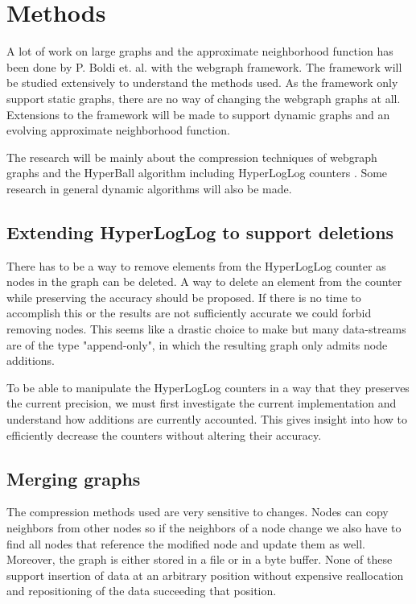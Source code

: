 \chapter{Methods}


A lot of work on large graphs and the approximate neighborhood function has been done by P. Boldi et. al. with the webgraph framework\cite{webgraph}. The framework will be studied extensively to understand the methods used. As the framework only support static graphs, there are no way of changing the webgraph graphs at all. Extensions to the framework will be made to support dynamic graphs and an evolving approximate neighborhood function. 

The research will be mainly about the compression techniques of webgraph graphs \cite{webgraph-compression} and the HyperBall algorithm \cite{hyperball} including HyperLogLog counters \cite{hyperloglog}. Some research in general dynamic algorithms will also be made.

\section{Extending HyperLogLog to support deletions}
There has to be a way to remove elements from the HyperLogLog counter as nodes in the graph can be deleted. A way to delete an element from the counter while preserving the accuracy should be proposed. If there is no time to accomplish this or the results are not sufficiently accurate we could forbid removing nodes. This seems like a drastic choice to make but many data-streams are of the type "append-only", in which the resulting graph only admits node additions.

To be able to manipulate the HyperLogLog counters in a way that they preserves the current precision, we must first investigate the current implementation and understand how additions are currently accounted. This gives insight into how to efficiently decrease the counters without altering their accuracy.

\section{Merging graphs}

The compression methods used are very sensitive to changes. Nodes can copy neighbors from other nodes so if the neighbors of a node change we also have to find all nodes that reference the modified node and update them as well. Moreover, the graph is either stored in a file or in a byte buffer. None of these support insertion of data at an arbitrary position without expensive reallocation and repositioning of the data succeeding that position. 

